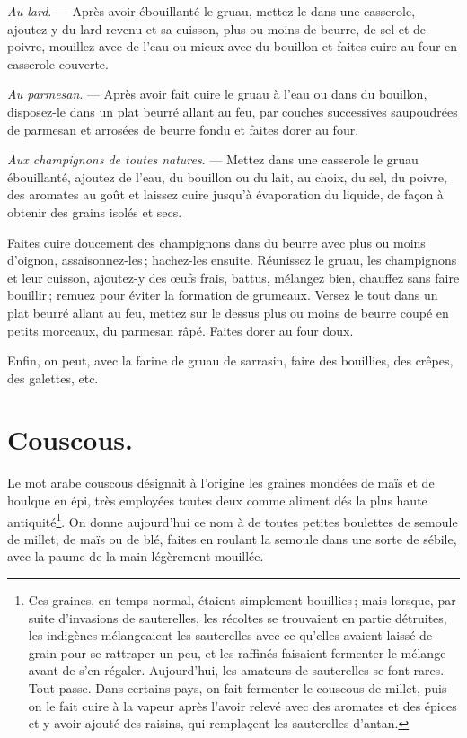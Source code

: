 \medskip

\textit{Au lard}. — Après avoir ébouillanté le gruau, mettez-le dans une
casserole, ajoutez-y du lard revenu et sa cuisson, plus ou moins de beurre, de
sel et de poivre, mouillez avec de l'eau ou mieux avec du bouillon et faites
cuire au four en casserole couverte.

\medskip

\textit{Au parmesan}. — Après avoir fait cuire le gruau à l'eau ou dans du
bouillon, disposez-le dans un plat beurré allant au feu, par couches
successives saupoudrées de parmesan et arrosées de beurre fondu et faites dorer
au four.

\medskip

\textit{Aux champignons de toutes natures}. — Mettez dans une casserole le
gruau ébouillanté, ajoutez de l'eau, du bouillon ou du lait, au choix, du sel,
du poivre, des aromates au goût et laissez cuire jusqu'à évaporation du
liquide, de façon à obtenir des grains isolés et secs.

Faites cuire doucement des champignons dans du beurre avec plus ou moins
d'oignon, assaisonnez-les ; hachez-les ensuite. Réunissez le gruau, les
champignons et leur cuisson, ajoutez-y des œufs frais, battus, mélangez bien,
chauffez sans faire bouillir ; remuez pour éviter la formation de grumeaux.
Versez le tout dans un plat beurré allant au feu, mettez sur le dessus plus ou
moins de beurre coupé en petits morceaux, du parmesan râpé. Faites dorer au
four doux.

\medskip

Enfin, on peut, avec la farine de gruau de sarrasin, faire des bouillies, des
crêpes, des galettes, etc.

\section*{\centering Couscous.}
{}
\label{pg0704} \hypertarget{p0704}{}

Le mot arabe couscous désignait à l'origine les graines mondées de maïs et de
houlque en épi, très employées toutes deux comme aliment dés la plus haute
antiquité\footnote{ Ces graines, en temps normal, étaient simplement
bouillies ; mais lorsque, par suite d'invasions de sauterelles, les récoltes se
trouvaient en partie détruites, les indigènes mélangeaient les sauterelles avec
ce qu'elles avaient laissé de grain pour se rattraper un peu, et les raffinés
faisaient fermenter le mélange avant de s'en régaler. Aujourd'hui, les amateurs
de sauterelles se font rares. Tout passe.
\protect\endgraf
Dans certains pays, on fait fermenter le couscous de millet, puis on le fait
cuire à la vapeur après l'avoir relevé avec des aromates et des épices et
y avoir ajouté des raisins, qui remplaçent les sauterelles d'antan.}. On donne
aujourd'hui ce nom à de toutes petites boulettes de semoule de millet, de maïs
ou de blé, faites en roulant la semoule dans une sorte de sébile, avec la paume
de la main légèrement mouillée.

